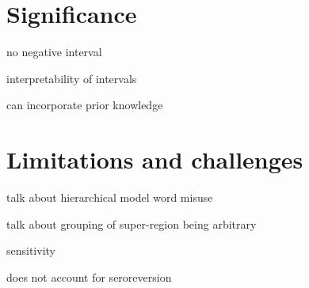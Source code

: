 \section{Significance}
no negative interval

interpretability of intervals

can incorporate prior knowledge

\section{Limitations and challenges}
talk about hierarchical model word misuse

talk about grouping of super-region being arbitrary

sensitivity

does not account for seroreversion